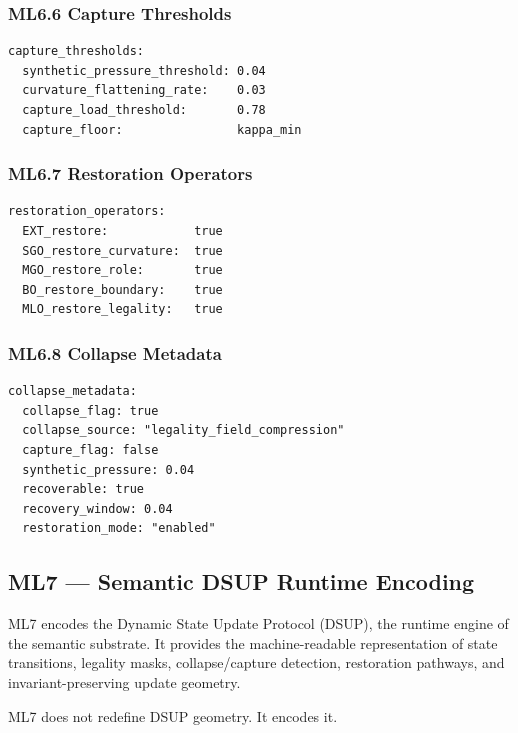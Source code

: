\subsubsection*{ML6.6 Capture Thresholds}

\begin{verbatim}
capture_thresholds:
  synthetic_pressure_threshold: 0.04
  curvature_flattening_rate:    0.03
  capture_load_threshold:       0.78
  capture_floor:                kappa_min
\end{verbatim}
\subsubsection*{ML6.7 Restoration Operators}

\begin{verbatim}
restoration_operators:
  EXT_restore:            true
  SGO_restore_curvature:  true
  MGO_restore_role:       true
  BO_restore_boundary:    true
  MLO_restore_legality:   true
\end{verbatim}
\subsubsection*{ML6.8 Collapse Metadata}

\begin{verbatim}
collapse_metadata:
  collapse_flag: true
  collapse_source: "legality_field_compression"
  capture_flag: false
  synthetic_pressure: 0.04
  recoverable: true
  recovery_window: 0.04
  restoration_mode: "enabled"
\end{verbatim}



\subsection*{ML7 — Semantic DSUP Runtime Encoding}

ML7 encodes the Dynamic State Update Protocol (DSUP), the runtime engine of the
semantic substrate. It provides the machine-readable representation of state
transitions, legality masks, collapse/capture detection, restoration pathways,
and invariant-preserving update geometry.

ML7 does not redefine DSUP geometry.
It encodes it.

